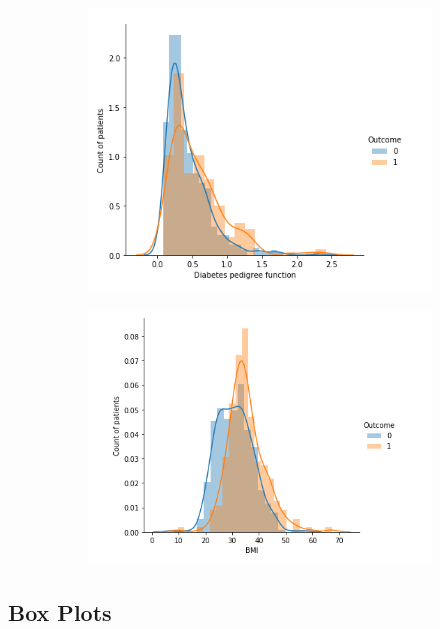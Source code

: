 \documentclass[12pt]{article}
\begin{document}
\begin{figure}
\centering
\begin{subfigure}{0.6\textwidth}
  \centering
  \includegraphics[width=1\linewidth]{dpfunct.PNG}
  \label{fig:sub1}
\end{subfigure}%
\begin{subfigure}{.6\textwidth}
  \centering
  \includegraphics[width=1\linewidth]{BMI.PNG}
  \label{fig:sub2}
\end{subfigure}
\label{fig:test}
\end{figure}

\newpage
\subsection{Box Plots}
\end{document}
